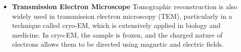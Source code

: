 \documentclass{article}
\begin{document}
\begin{itemize}
	 \item \textbf{Transmission Electron Microscope}
 \newline
		 Tomographic reconstruction is also widely used in transmission electron microscopy (TEM), particularly in a technique called cryo-EM, which is extensively applied in biology and medicine. In cryo-EM, the sample is frozen, and the charged nature of electrons allows them to be directed using magnetic and electric fields.
\newline
		 \vspace{0.2cm}
\newline
{}
\end{itemize}
\end{document}
